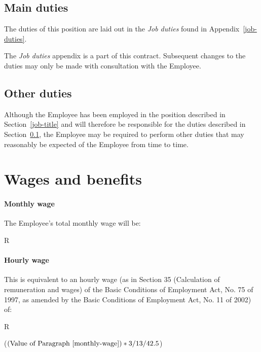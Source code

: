 \documentclass[a4paper,11pt]{article}
\begin{document}
\subsection{Main duties}
\label{main-duties}

\para The duties of this position are laid out in the \textit{Job duties} found
in Appendix~\ref{job-duties}.

\para The \textit{Job duties} appendix is a part of this contract. Subsequent
changes to the duties may only be made with consultation with the Employee.

\subsection{Other duties}
\label{other-duties}

\para Although the Employee has been employed in the position described in
Section~\ref{job-title} and will therefore be responsible for the duties
described in Section~\ref{main-duties}, the Employee may be required to perform
other duties that may reasonably be expected of the Employee from time to time.

\section{Wages and benefits}
\label{wages}

\paragraph{Monthly wage}\label{monthly-wage} The Employee's total monthly wage
will be:

\begin{center}
  R 
\end{center}

\paragraph{Hourly wage}\label{hourly-wage} This is equivalent to an hourly wage
(as in Section 35 (Calculation of remuneration and wages) of the Basic
Conditions of Employment Act, No. 75 of 1997, as amended by the Basic
Conditions of Employment Act, No. 11 of 2002) of:

\begin{center}
  R 

  (\((\text{Value of Paragraph~\ref{monthly-wage}}) * 3 / 13 / 42.5 \))
\end{center}
\end{document}
